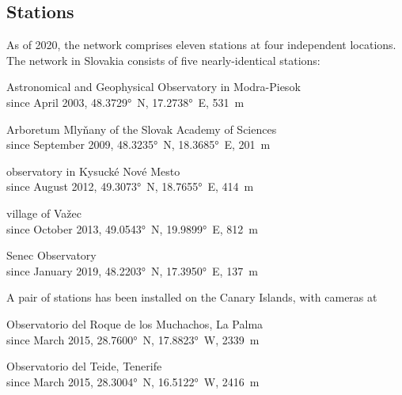     \subsection{Stations} \label{iAs}
        As of 2020, the network comprises eleven stations at four independent locations.
        The network in Slovakia consists of five nearly-identical stations:
        \begin{description}[leftmargin = 25mm]
            \item[AGO]      Astronomical and Geophysical Observatory in Modra-Piesok\\
                            since April 2003, \ang{48.3729}~N, \ang{17.2738}~E, \SI{531}{\metre}
            \item[ARBO]     Arboretum Mlyňany of the Slovak Academy of Sciences\\
                            since September 2009, \ang{48.3235}~N, \ang{18.3685}~E, \SI{201}{\metre}
            \item[KNM]      observatory in Kysucké Nové Mesto\\
                            since August 2012, \ang{49.3073}~N, \ang{18.7655}~E, \SI{414}{\metre}
            \item[VAZEC]    village of Važec\\
                            since October 2013, \ang{49.0543}~N, \ang{19.9899}~E, \SI{812}{\metre}
            \item[SENEC]    Senec Observatory\\
                            since January 2019, \ang{48.2203}~N, \ang{17.3950}~E, \SI{137}{\metre}
        \end{description}

        A pair of stations has been installed on the Canary Islands, with cameras at
        \begin{description}[leftmargin = 25mm]
            \item[LP]       Observatorio del Roque de los Muchachos, La Palma \\
                            since March 2015, \ang{28.7600}~N, \ang{17.8823}~W, \SI{2339}{\metre}
            \item[TE]       Observatorio del Teide, Tenerife \\
                            since March 2015, \ang{28.3004}~N, \ang{16.5122}~W, \SI{2416}{\metre}
        \end{description}

